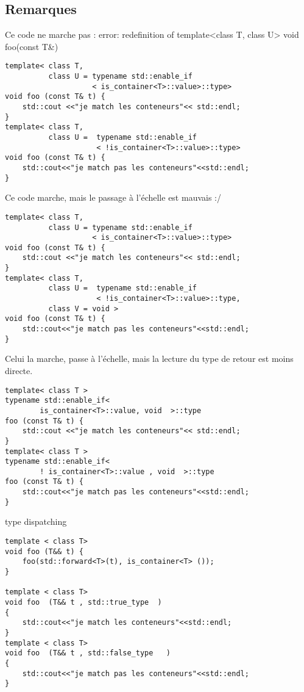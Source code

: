 \documentclass{beamer}
\begin{document}
\subsection{Remarques}
\begin{frame}[containsverbatim]
	Ce code ne marche pas : error: redefinition of template<class T, class U> void foo(const T\&)
	\begin{lstlisting}
template< class T,
          class U = typename std::enable_if
                    < is_container<T>::value>::type>
void foo (const T& t) {
    std::cout <<"je match les conteneurs"<< std::endl;
}
template< class T, 
          class U =  typename std::enable_if
                     < !is_container<T>::value>::type>
void foo (const T& t) {
    std::cout<<"je match pas les conteneurs"<<std::endl;
}
	\end{lstlisting}
\end{frame}
\begin{frame}[containsverbatim]
	Ce code marche, mais le passage à l’échelle est mauvais :/
	\begin{lstlisting}
template< class T,
          class U = typename std::enable_if
                    < is_container<T>::value>::type>
void foo (const T& t) {
    std::cout <<"je match les conteneurs"<< std::endl;
}
template< class T, 
          class U =  typename std::enable_if
                     < !is_container<T>::value>::type,
          class V = void >
void foo (const T& t) {
    std::cout<<"je match pas les conteneurs"<<std::endl;
}
	\end{lstlisting}
\end{frame}
\begin{frame}[containsverbatim]
	Celui la marche, passe à l’échelle, mais la lecture du type de retour est moins directe. 
	\begin{lstlisting}
template< class T >
typename std::enable_if< 
        is_container<T>::value, void  >::type
foo (const T& t) {
    std::cout <<"je match les conteneurs"<< std::endl;
}
template< class T >
typename std::enable_if< 
        ! is_container<T>::value , void  >::type  
foo (const T& t) {
    std::cout<<"je match pas les conteneurs"<<std::endl;
}
	\end{lstlisting}

\end{frame}

\begin{frame}[containsverbatim]
type dispatching
	\begin{lstlisting}
template < class T>
void foo (T&& t) {
    foo(std::forward<T>(t), is_container<T> ()); 
}

template < class T>
void foo  (T&& t , std::true_type  )
{
    std::cout<<"je match les conteneurs"<<std::endl;
}
template < class T>
void foo  (T&& t , std::false_type   )
{
    std::cout<<"je match pas les conteneurs"<<std::endl;
}
	\end{lstlisting}

\end{frame}
\end{document}
